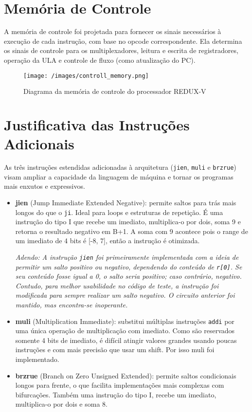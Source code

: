 \documentclass[12pt]{article}
\begin{document}
\section{Memória de Controle}

A memória de controle foi projetada para fornecer os sinais necessários à execução de cada instrução, com base no opcode correspondente. Ela determina os sinais de controle para os multiplexadores, leitura e escrita de registradores, operação da ULA e controle de fluxo (como atualização do PC).

\begin{figure}[H]
\centering
\texttt{[image: /images/controll\_memory.png]}
\caption{Diagrama da memória de controle do processador REDUX-V}
\label{fig:memoria_controle}
\end{figure}

\section{Justificativa das Instruções Adicionais}

As três instruções estendidas adicionadas à arquitetura (\texttt{jien}, \texttt{muli} e \texttt{brzrue}) visam ampliar a capacidade da linguagem de máquina e tornar os programas mais enxutos e expressivos.

\begin{itemize}
  \item \textbf{jien} (Jump Immediate Extended Negative): permite saltos para trás mais longos do que o \texttt{ji}. Ideal para loops e estruturas de repetição. É uma instrução do tipo I que recebe um imediato, multiplica-o por dois, soma 9 e retorna o resultado negativo em B+1. A soma com 9 acontece pois o range de um imediato de 4 bits é [-8, 7], então a instrução é otimizada.

  \textit{Adendo: A instrução \texttt{jien} foi primeiramente implementada com a ideia de permitir um salto positivo ou negativo, dependendo do conteúdo de \texttt{r[0]}. Se seu conteúdo fosse igual a 0, o salto seria positivo; caso contrário, negativo. Contudo, para melhor usabilidade no código de teste, a instrução foi modificada para sempre realizar um salto negativo. O circuito anterior foi mantido, mas encontra-se inoperante.}

  \item \textbf{muli} (Multiplication Immediate): substitui múltiplas instruções \texttt{addi} por uma única operação de multiplicação com imediato. Como são reservados somente 4 bits de imediato, é difícil atingir valores grandes usando poucas instruções e com mais precisão que usar um shift. Por isso muli foi implementado.
  \item \textbf{brzrue} (Branch on Zero Unsigned Extended): permite saltos condicionais longos para frente, o que facilita implementações mais complexas com bifurcações. Também uma instrução do tipo I, recebe um imediato, multiplica-o por dois e soma 8.
\end{itemize}
\end{document}
